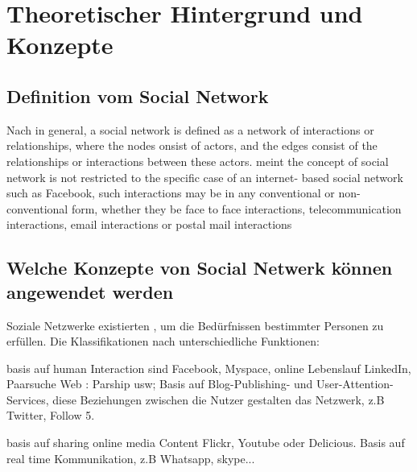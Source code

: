 
\chapter{Theoretischer Hintergrund und Konzepte}


\section{Definition vom Social Network}

Nach \textcite[S. 2]{aggarwal:sn} \glqq in general, a social network is defined as a network of interactions or relationships, where the nodes onsist of actors, and the edges consist of the relationships or interactions between these actors.\grqq \textcite{aggarwal:sn} meint \glqq the concept of social network is not restricted to the specific case of an internet- based social network such as Facebook, such interactions may be in any conventional or non-conventional form, whether they be face to face interactions, telecommunication interactions, email interactions or postal mail interactions\grqq


\section{Welche Konzepte von Social Netwerk können angewendet werden}

Soziale Netzwerke existierten , um die Bedürfnissen bestimmter Personen zu erfüllen. Die Klassifikationen nach unterschiedliche Funktionen:

basis auf human Interaction sind Facebook, Myspace, online Lebenslauf LinkedIn, Paarsuche Web : Parship usw;  Basis auf Blog-Publishing- und User-Attention-Services, diese Beziehungen zwischen die Nutzer gestalten das Netzwerk, z.B Twitter, Follow 5. 

basis auf sharing online media Content Flickr, Youtube oder Delicious.
Basis auf real time Kommunikation, z.B Whatsapp, skype...

